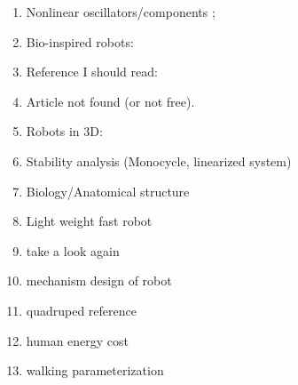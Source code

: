 \documentclass{article}
\begin{document}
\begin{enumerate}
\item Nonlinear oscillators/components \cite{Akinfiev1999,Anand1966,Babitsky1996,Buchli2006,Chatterjee2012};
\item Bio-inspired robots: \cite{Ananthanarayanan2012,Lock2014}
\item Reference I should read: \cite{Cham2002,Daley2006,Kagawa2010,Karssen2011}
\item Article not found (or not free)\cite{Alexander1979}.
\item Robots in 3D: \cite{Coleman1997}
\item Stability analysis (Monocycle, linearized system) \cite{Coleman2010}
\item Biology/Anatomical structure \cite{El-Mahdy2010,Gangl2004}
\item Light weight fast robot \cite{Ethington2013,Iida2012}
\item take a look again \cite{Gatesy1991}
\item mechanism design of robot \cite{Grimmer2011}
\item quadruped reference \cite{Hackert2001}
\item human energy cost \cite{Holt1991}
\item walking parameterization \cite{Lee2008}
\end{enumerate}
\end{document}

